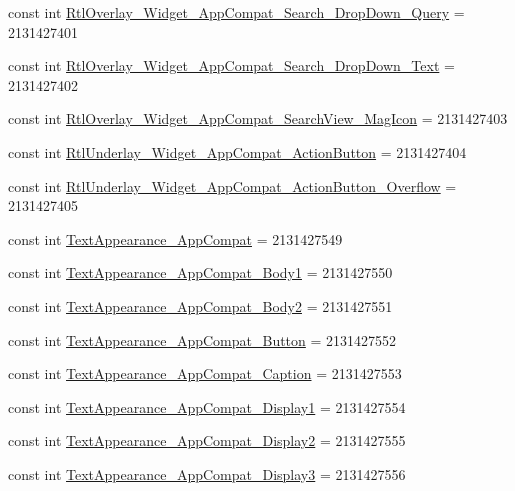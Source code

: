 \begin{CompactItemize}
\item 
const int \hyperlink{class__2doo_1_1_droid_1_1_resource_1_1_style_f2a28e7cf3c2342c166a092ec1c2670d}{RtlOverlay\_\-Widget\_\-AppCompat\_\-Search\_\-DropDown\_\-Query} = 2131427401
\item 
const int \hyperlink{class__2doo_1_1_droid_1_1_resource_1_1_style_b3b2b510390aa1e9f9e98f39c4f891a3}{RtlOverlay\_\-Widget\_\-AppCompat\_\-Search\_\-DropDown\_\-Text} = 2131427402
\item 
const int \hyperlink{class__2doo_1_1_droid_1_1_resource_1_1_style_4cf3b9ec8102d1bd599fdd8594661fa4}{RtlOverlay\_\-Widget\_\-AppCompat\_\-SearchView\_\-MagIcon} = 2131427403
\item 
const int \hyperlink{class__2doo_1_1_droid_1_1_resource_1_1_style_d677cdaa61d4ac3780e6ed94aa38b74b}{RtlUnderlay\_\-Widget\_\-AppCompat\_\-ActionButton} = 2131427404
\item 
const int \hyperlink{class__2doo_1_1_droid_1_1_resource_1_1_style_9e04399ea82f0fda2494c236cbb83b3c}{RtlUnderlay\_\-Widget\_\-AppCompat\_\-ActionButton\_\-Overflow} = 2131427405
\item 
const int \hyperlink{class__2doo_1_1_droid_1_1_resource_1_1_style_94f027183a18f0f7bb925d8254d94d3f}{TextAppearance\_\-AppCompat} = 2131427549
\item 
const int \hyperlink{class__2doo_1_1_droid_1_1_resource_1_1_style_74d29a1a7c00ab3f4e3c45ef86af7776}{TextAppearance\_\-AppCompat\_\-Body1} = 2131427550
\item 
const int \hyperlink{class__2doo_1_1_droid_1_1_resource_1_1_style_e506c2760c1337c236a4f1a2614f41cc}{TextAppearance\_\-AppCompat\_\-Body2} = 2131427551
\item 
const int \hyperlink{class__2doo_1_1_droid_1_1_resource_1_1_style_bd1b131df8fa418c7421e54744dc1b7d}{TextAppearance\_\-AppCompat\_\-Button} = 2131427552
\item 
const int \hyperlink{class__2doo_1_1_droid_1_1_resource_1_1_style_fe79ea221d556542f9c7eba06594e523}{TextAppearance\_\-AppCompat\_\-Caption} = 2131427553
\item 
const int \hyperlink{class__2doo_1_1_droid_1_1_resource_1_1_style_709e65bf167a3ed02357ddddd2094c97}{TextAppearance\_\-AppCompat\_\-Display1} = 2131427554
\item 
const int \hyperlink{class__2doo_1_1_droid_1_1_resource_1_1_style_26f4929a710cb9e04fdd8c4a73c0244d}{TextAppearance\_\-AppCompat\_\-Display2} = 2131427555
\item 
const int \hyperlink{class__2doo_1_1_droid_1_1_resource_1_1_style_80508a403fb1b89ff1a6217b5edd29b1}{TextAppearance\_\-AppCompat\_\-Display3} = 2131427556

\end{CompactItemize}
